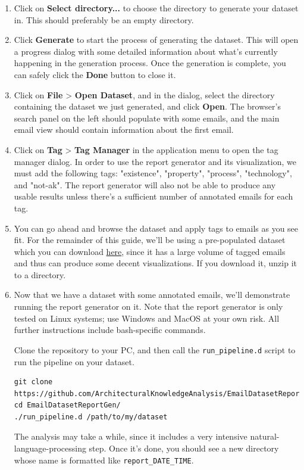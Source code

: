 \documentclass[a4paper, 12pt]{article}
\begin{document}
\begin{enumerate}
			\item Click on \textbf{Select directory...} to choose the directory to generate your dataset in. This should preferably be an empty directory.
			
			\item Click \textbf{Generate} to start the process of generating the dataset. This will open a progress dialog with some detailed information about what's currently happening in the generation process. Once the generation is complete, you can safely click the \textbf{Done} button to close it.
			
			\item Click on \textbf{File} > \textbf{Open Dataset}, and in the dialog, select the directory containing the dataset we just generated, and click \textbf{Open}. The browser's search panel on the left should populate with some emails, and the main email view should contain information about the first email.
			
			\item Click on \textbf{Tag} > \textbf{Tag Manager} in the application menu to open the tag manager dialog. In order to use the report generator and its visualization, we must add the following tags: "existence", "property", "process", "technology", and "not-ak". The report generator will also not be able to produce any usable results unless there's a sufficient number of annotated emails for each tag.
			
			\item You can go ahead and browse the dataset and apply tags to emails as you see fit. For the remainder of this guide, we'll be using a pre-populated dataset which you can download \href{https://github.com/ArchitecturalKnowledgeAnalysis/Datasets/raw/main/datasets/iteration-9.zip}{here}, since it has a large volume of tagged emails and thus can produce some decent visualizations. If you download it, unzip it to a directory.
			
			\item Now that we have a dataset with some annotated emails, we'll demonstrate running the report generator on it. Note that the report generator is only tested on Linux systems; use Windows and MacOS at your own risk. All further instructions include bash-specific commands.
			
				Clone the repository to your PC, and then call the \texttt{run\_pipeline.d} script to run the pipeline on your dataset.
				\begin{verbatim}
git clone https://github.com/ArchitecturalKnowledgeAnalysis/EmailDatasetReportGen.git
cd EmailDatasetReportGen/
./run_pipeline.d /path/to/my/dataset
				\end{verbatim}
				The analysis may take a while, since it includes a very intensive natural-language-processing step. Once it's done, you should see a new directory whose name is formatted like \texttt{report\_DATE\_TIME}.
				

\end{enumerate}
\end{document}
